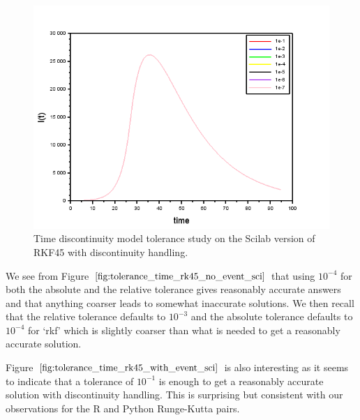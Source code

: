 \begin{figure}[H]
\centering
\includegraphics[width=0.7\linewidth]{./figures/tolerance_time_rk45_with_event_sci}
\caption{Time discontinuity model tolerance study on the Scilab version of RKF45 with discontinuity handling.}
\label{fig:tolerance_time_rk45_with_event_sci}
\end{figure}

We see from Figure $\ref{fig:tolerance_time_rk45_no_event_sci}$ that using $10^{-4}$ for both the absolute and the relative tolerance gives reasonably accurate answers and that anything coarser leads to somewhat inaccurate solutions. We then recall that the relative tolerance defaults to $10^{-3}$ and the absolute tolerance defaults to $10^{-4}$ for `rkf' which is slightly coarser than what is needed to get a reasonably accurate solution.

Figure $\ref{fig:tolerance_time_rk45_with_event_sci}$ is also interesting as it seems to indicate that a tolerance of $10^{-1}$ is enough to get a reasonably accurate solution with discontinuity handling. This is surprising but consistent with our observations for the R and Python Runge-Kutta pairs.

